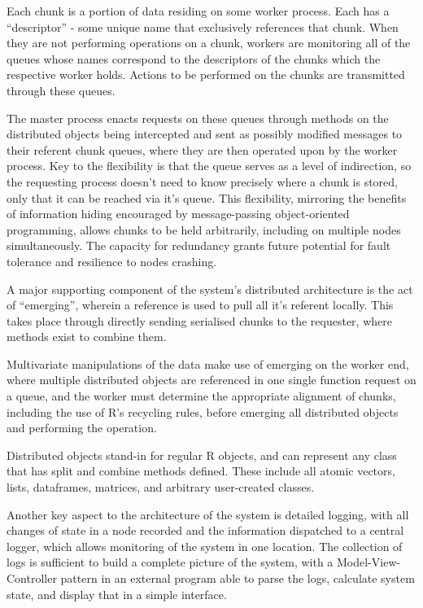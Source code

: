 Each chunk is a portion of data residing on some worker process.
Each has a ``descriptor'' - some unique name that exclusively references that chunk.
When they are not performing operations on a chunk, workers are monitoring all of the queues whose names correspond to the descriptors of the chunks which the respective worker holds.
Actions to be performed on the chunks are transmitted through these queues.

The master process enacts requests on these queues through methods on the distributed objects being intercepted and sent as possibly modified messages to their referent chunk queues, where they are then operated upon by the worker process.
Key to the flexibility is that the queue serves as a level of indirection, so the requesting process doesn't need to know precisely where a chunk is stored, only that it can be reached via it's queue.
This flexibility, mirroring the benefits of information hiding encouraged by message-passing object-oriented programming, allows chunks to be held arbitrarily, including on multiple nodes simultaneously.
The capacity for redundancy grants future potential for fault tolerance and resilience to nodes crashing.

A major supporting component of the system's distributed architecture is the act of ``emerging'', wherein a reference is used to pull all it's referent locally\cite{emmerich2000engineering}.
This takes place through directly sending serialised chunks to the requester, where methods exist to combine them.

Multivariate manipulations of the data make use of emerging on the worker end, where multiple distributed objects are referenced in one single function request on a queue, and the worker must determine the appropriate alignment of chunks, including the use of R's recycling rules, before emerging all distributed objects and performing the operation.

Distributed objects stand-in for regular R objects, and can represent any class that has split and combine methods defined.
These include all atomic vectors, lists, dataframes, matrices, and arbitrary user-created classes.

Another key aspect to the architecture of the system is detailed logging, with all changes of state in a node recorded and the information dispatched to a central logger, which allows monitoring of the system in one location. The collection of logs is sufficient to build a complete picture of the system, with a Model-View-Controller pattern in an external program able to parse the logs, calculate system state, and display that in a simple interface\cite{gamma1995design}.

